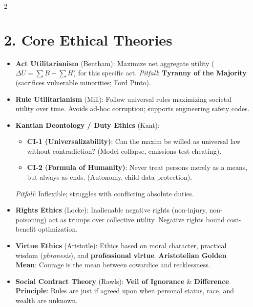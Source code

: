 \documentclass[9pt,a4paper]{extarticle}
\begin{document}
\begin{multicols}{2}
\section{2. Core Ethical Theories}

\begin{tcolorbox}[theorybox,title={Comparative Ethical Frameworks}]
\begin{itemize}[leftmargin=9pt]
  \item \textbf{Act Utilitarianism} (Bentham): Maximize net aggregate utility ($\Delta U = \sum B - \sum H$) for this specific act. \textit{Pitfall}: \textbf{Tyranny of the Majority} (sacrifices vulnerable minorities; Ford Pinto).
  \item \textbf{Rule Utilitarianism} (Mill): Follow universal rules maximizing societal utility over time. Avoids ad-hoc corruption; supports engineering safety codes.
  \item \textbf{Kantian Deontology / Duty Ethics} (Kant):
    \begin{itemize}[leftmargin=8pt]
      \item \textbf{CI-1 (Universalizability)}: Can the maxim be willed as universal law without contradiction? (Model collapse, emissions test cheating).
      \item \textbf{CI-2 (Formula of Humanity)}: Never treat persons merely as a means, but always as ends. (Autonomy, child data protection).
    \end{itemize}
    \textit{Pitfall}: Inflexible; struggles with conflicting absolute duties.
  \item \textbf{Rights Ethics} (Locke): Inalienable negative rights (non-injury, non-poisoning) act as trumps over collective utility. Negative rights bound cost-benefit optimization.
  \item \textbf{Virtue Ethics} (Aristotle): Ethics based on moral character, practical wisdom (\textit{phronesis}), and \textbf{professional virtue}. \textbf{Aristotelian Golden Mean}: Courage is the mean between cowardice and recklessness.
  \item \textbf{Social Contract Theory} (Rawls): \textbf{Veil of Ignorance} \& \textbf{Difference Principle}: Rules are just if agreed upon when personal status, race, and wealth are unknown.
\end{itemize}
\end{tcolorbox}


\end{multicols}
\end{document}
